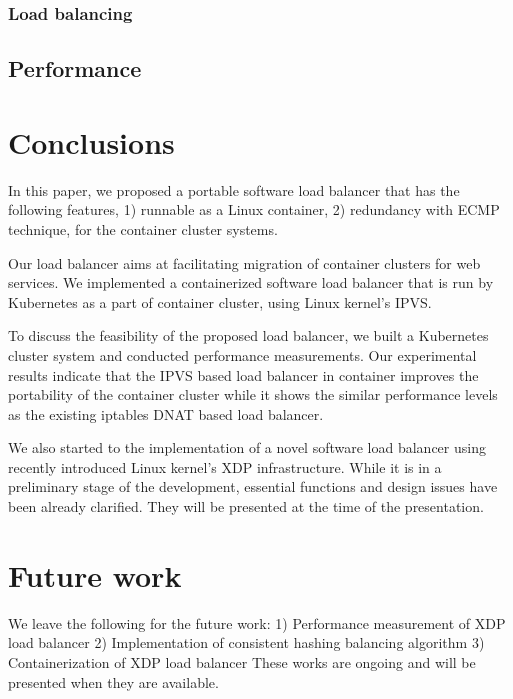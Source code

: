\subsubsection{Load balancing}

\subsection{Performance}\label{Performance}



\section{Conclusions}\label{Conclusions}

In this paper, we proposed a portable software load balancer that has the following features, 1) runnable as a Linux container, 2) redundancy with ECMP technique,  for the container cluster systems.

Our load balancer aims at facilitating migration of container clusters for web services.
We implemented a containerized software load balancer that is run by Kubernetes as a part of container cluster,
using Linux kernel's IPVS.

To discuss the feasibility of the proposed load balancer, we built
a Kubernetes cluster system and conducted performance measurements.
Our experimental results indicate that the IPVS based load balancer in container improves the portability of
the container cluster while it shows the similar performance levels as the existing iptables DNAT based load balancer.

We also started to the implementation of a novel software load balancer using recently introduced Linux kernel's XDP infrastructure.
While it is in a preliminary stage of the development, essential functions and design issues have been already clarified.
They will be presented at the time of the presentation.

\section{Future work}\label{Future work}

We leave the following for the future work:
1) Performance measurement of XDP load balancer
2) Implementation of consistent hashing balancing algorithm
3) Containerization of XDP load balancer
These works are ongoing and will be presented when they are available.

